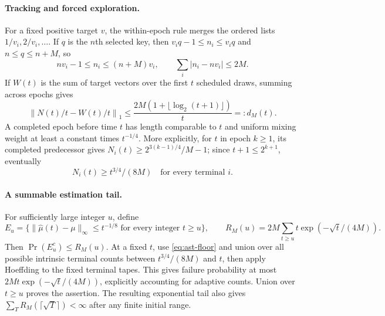 \documentclass{article}
\theoremstyle{plain}
\theoremstyle{definition}
\begin{document}
\paragraph{Tracking and forced exploration.}
For a fixed positive target $v$, the within-epoch rule merges the ordered
lists $1/v_i,2/v_i,\ldots$.  If $q$ is the $n$th selected key, then
$v_iq-1\le n_i\le v_iq$ and $n\le q\le n+M$, so
\[
 n v_i-1\le n_i\le(n+M)v_i,\qquad
 \sum_i|n_i-nv_i|\le2M.
\]
If $W(t)$ is the sum of target vectors over the first $t$ scheduled draws,
summing across epochs gives
\begin{equation}
 \left\|N(t)/t-W(t)/t\right\|_1
 \le\frac{2M(1+\lfloor\log_2(t+1)\rfloor)}{t}=:d_M(t).
 \label{eq:ast-tracking}
\end{equation}
A completed epoch before time $t$ has length comparable to $t$ and uniform
mixing weight at least a constant times $t^{-1/4}$.  More explicitly,
for $t$ in epoch $k\ge1$, its completed predecessor gives
$N_i(t)\ge2^{3(k-1)/4}/M-1$; since $t+1\le2^{k+1}$, eventually
\begin{equation}
 N_i(t)\ge t^{3/4}/(8M)\quad\text{for every terminal }i.
 \label{eq:ast-floor}
\end{equation}

\paragraph{A summable estimation tail.}
For sufficiently large integer $u$, define
\[
 E_u=\{\|\widehat\mu(t)-\mu\|_\infty\le t^{-1/8}
                       \text{ for every integer }t\ge u\},\qquad
 R_M(u)=2M\sum_{t\ge u}t\exp(-\sqrt t/(4M)).
\]
Then $\Pr(E_u^c)\le R_M(u)$.  At a fixed $t$, use
\eqref{eq:ast-floor} and union over all possible intrinsic terminal counts
between $t^{3/4}/(8M)$ and $t$, then apply Hoeffding to the fixed terminal
tapes.  This gives failure probability at most
$2Mt\exp(-\sqrt t/(4M))$, explicitly accounting for adaptive counts.
Union over $t\ge u$ proves the assertion.  The resulting exponential tail
also gives $\sum_T R_M(\lceil\sqrt T\rceil)<\infty$ after any finite
initial range.
\end{document}
